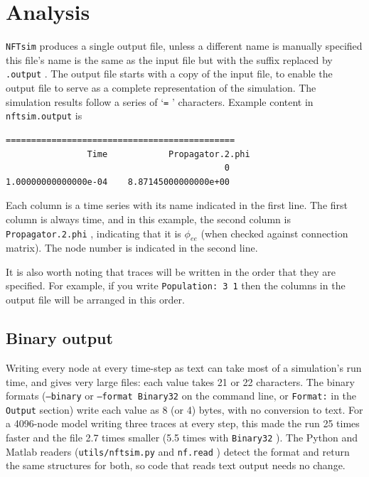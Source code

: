 \documentclass[12pt,a4paper]{article}
\newcommand{\type}[1]{{\small\small\tt #1} }
\newcommand{\NF}[0]{\type{NFTsim}}
\begin{document}
\section{Analysis}
\label{sec:analysis}

\NF produces a single output file, unless a different name is manually specified this file's name is the same as the input file but with the suffix replaced by \type{.output}. The output file starts with a copy of the input file, to enable the output file to serve as a complete representation of the simulation. The simulation results follow a series of `\type{=}' characters. Example content in \type{nftsim.output} is
\begin{lstlisting}
=============================================
                Time            Propagator.2.phi
                                           0
1.00000000000000e-04    8.87145000000000e+00
\end{lstlisting}

Each column is a time series with its name indicated in the first line. The first column is always time, and in this example, the second column is \type{Propagator.2.phi}, indicating that it is $\phi_{ee}$ (when checked against connection matrix). The node number is indicated in the second line.

It is also worth noting that traces will be written in the order that they are specified. For example, if you write \type{Population: 3 1} then the columns in the output file will be arranged in this order.

\subsection{Binary output}
\label{sec:binary_output}

Writing every node at every time-step as text can take most of a simulation's run time, and gives very large files: each value takes 21 or 22 characters.
The binary formats (\type{--binary} or \type{--format Binary32} on the command line, or \type{Format:} in the \type{Output} section) write each value as 8 (or 4) bytes, with no conversion to text.
For a 4096-node model writing three traces at every step, this made the run 25 times faster and the file 2.7 times smaller (5.5 times with \type{Binary32}).
The Python and Matlab readers (\type{utils/nftsim.py} and \type{nf.read}) detect the format and return the same structures for both, so code that reads text output needs no change.
\end{document}
